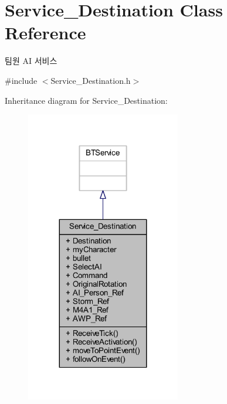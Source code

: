 \hypertarget{class_service___destination}{}\section{Service\+\_\+\+Destination Class Reference}
\label{class_service___destination}


팀원 AI 서비스  




{\ttfamily \#include $<$Service\+\_\+\+Destination.\+h$>$}



Inheritance diagram for Service\+\_\+\+Destination\+:\nopagebreak
\begin{figure}[H]
\begin{center}
\leavevmode
\includegraphics[width=191pt]{class_service___destination__inherit__graph}
\end{center}
\end{figure}


